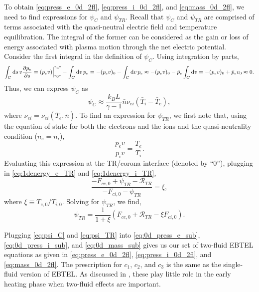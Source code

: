 To obtain \autoref{eq:press_e_0d_2fl}, \autoref{eq:press_i_0d_2fl}, and \autoref{eq:mass_0d_2fl}, we need to find expressions for $\psi_C$ and $\psi_{TR}$. Recall that $\psi_C$ and $\psi_{TR}$ are comprised of terms associated with the quasi-neutral electric field and temperature equilibration. The integral of the former can be considered as the gain or loss of energy associated with plasma motion through the net electric potential. Consider the first integral in the definition of $\psi_C$. Using integration by parts,
\begin{equation}
    \int_C\mathrm{d}s\,v\frac{\partial p_e}{\partial s} = (p_ev)\Big|^{``a"}_{``0"} - \int_C\mathrm{d}v\,p_e = -(p_ev)_0 - \int_C\mathrm{d}v\,p_e\approx -(p_ev)_0 -\bar{p}_e\int_C\mathrm{d}v = -(p_ev)_0 + \bar{p}_ev_0 \approx 0.
\end{equation}
Thus, we can express $\psi_C$ as
\begin{equation}
    \psi_C\approx\frac{k_BL}{\gamma -1}\bar{n}\nu_{ei}(\bar{T}_i - \bar{T}_e),
    \label{eq:psi_C}
\end{equation}
where $\nu_{ei}=\nu_{ei}(\bar{T}_e,\bar{n})$. To find an expression for $\psi_{TR}$, we first note that, using the equation of state for both the electrons and the ions and the quasi-neutrality condition ($n_e=n_i$),
\begin{equation}
    \frac{p_ev}{p_iv} = \frac{T_e}{T_i}.
\end{equation}
Evaluating this expression at the TR/corona interface (denoted by ``0''), plugging in \autoref{eq:1denergy_e_TR} and \autoref{eq:1denergy_i_TR},
\begin{equation}
    \frac{- F_{ce,0} + \psi_{TR} - \mathcal{R}_{TR}}{- F_{ci,0} - \psi_{TR}} = \xi,
\end{equation}
where $\xi\equiv T_{e,0}/T_{i,0}$. Solving for $\psi_{TR}$, we find,
\begin{equation}
    \psi_{TR} = \frac{1}{1+\xi}(F_{ce,0} + \mathcal{R}_{TR} - \xi F_{ci,0}).
    \label{eq:psi_TR}
\end{equation}

Plugging \autoref{eq:psi_C} and \autoref{eq:psi_TR} into \autoref{eq:0d_press_e_sub}, \autoref{eq:0d_press_i_sub}, and \autoref{eq:0d_mass_sub} gives us our set of two-fluid EBTEL equations as given in \autoref{eq:press_e_0d_2fl}, \autoref{eq:press_i_0d_2fl}, and \autoref{eq:mass_0d_2fl}. The prescription for $c_1$, $c_2$, and $c_3$ is the same as the single-fluid version of EBTEL. As discussed in \citet{cargill_enthalpy-based_2012}, these play little role in the early heating phase when two-fluid effects are important.

